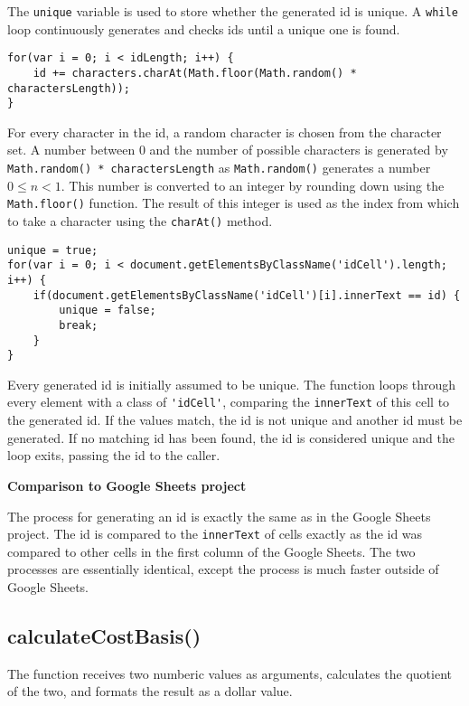 \documentclass[letterpaper]{article}
\begin{document}
The \lstinline{unique} variable is used to store whether the generated id is unique.
A \lstinline{while} loop continuously generates and checks ids until a unique one is found.

\begin{lstlisting}[firstnumber=119]
for(var i = 0; i < idLength; i++) {
    id += characters.charAt(Math.floor(Math.random() * charactersLength));
}
\end{lstlisting}

For every character in the id, a random character is chosen from the character set.
A number between 0 and the number of possible characters is generated by \lstinline{Math.random() * charactersLength} as \lstinline{Math.random()} generates a number $ 0 \leq n < 1 $.
This number is converted to an integer by rounding down using the \lstinline{Math.floor()} function.
The result of this integer is used as the index from which to take a character using the \lstinline{charAt()} method.

\begin{lstlisting}[firstnumber=123]
unique = true;
for(var i = 0; i < document.getElementsByClassName('idCell').length; i++) {
    if(document.getElementsByClassName('idCell')[i].innerText == id) {
        unique = false;
        break;
    }
}
\end{lstlisting}

Every generated id is initially assumed to be unique.
The function loops through every element with a class of \lstinline{'idCell'}, comparing the \lstinline{innerText} of this cell to the generated id.
If the values match, the id is not unique and another id must be generated.
If no matching id has been found, the id is considered unique and the loop exits, passing the id to the caller.

\textbf{Comparison to Google Sheets project}

The process for generating an id is exactly the same as in the Google Sheets project.
The id is compared to the \lstinline{innerText} of cells exactly as the id was compared to other cells in the first column of the Google Sheets.
The two processes are essentially identical, except the process is much faster outside of Google Sheets.

\subsection{calculateCostBasis()}

The function receives two numberic values as arguments, calculates the quotient of the two, and formats the result as a dollar value.
\end{document}
